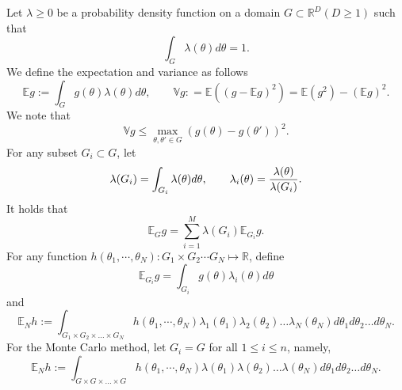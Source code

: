 Let $\lambda\ge 0$ be a probability density function on a domain $G \subset
\mathbb R^D (D\ge 1)$ such that
\begin{equation}\label{density}
\int_{G}\lambda(\theta)d\theta=1.
\end{equation}
We define the expectation and variance as follows
\begin{equation}
\label{E}
\mathbb{E}g:=\int_{G}
g(\theta)\lambda(\theta)d\theta,\qquad
\mathbb{V} g: = \mathbb{E}((g - \mathbb{E} g)^2)= \mathbb{E}(g^2) - (\mathbb{E} g)^2.
\end{equation}
We note that 
$$\displaystyle \mathbb{V} g\le \max_{\theta, \theta'\in G}(g(\theta) - g(\theta'))^2.
$$
For any subset $G_i\subset G$, let
$$
\lambda(G_i)=\int_{G_i}\lambda(\theta)d\theta, \qquad \lambda_i(\theta) = {\lambda(\theta)\over \lambda(G_i)}.
$$
It holds that
$$
\mathbb{E}_Gg= \sum_{i=1}^M \lambda(G_i) \mathbb{E}_{G_i}g.
$$ 
For any function $h(\theta_1,\cdots, \theta_N) : G_1\times G_2\cdots G_N \mapsto \mathbb{R}$, define 
$$\mathbb{E}_{G_i}g=\int_{G_i}g(\theta)\lambda_i(\theta)d\theta$$
 and
\begin{equation}
\label{En}
\mathbb{E}_Nh:=\int_{G_1\times G_2\times\ldots\times G_N}
h(\theta_1,\cdots,\theta_N) \lambda_1(\theta_1) \lambda_2(\theta_2)\ldots \lambda_N(\theta_N)
d\theta_1d\theta_2\ldots d\theta_N.
\end{equation}
For the Monte Carlo method, let $G_i=G$ for all $1\le i\le n$, namely,
\begin{equation} 
\mathbb{E}_Nh:=\int_{G\times G\times\ldots\times G}
h(\theta_1,\cdots,\theta_N) \lambda(\theta_1) \lambda(\theta_2)\ldots \lambda(\theta_N)
d\theta_1d\theta_2\ldots d\theta_N.
\end{equation}
